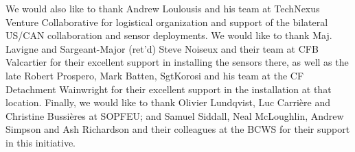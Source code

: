 \documentclass[fire,article,submit,moreauthors]{mdpi}
\providecommand{\DIFadd}[1]{{\protect\color{blue}\uwave{#1}}} %
\providecommand{\DIFaddbegin}{} %
\providecommand{\DIFaddend}{} %
\begin{document}
We would also like to thank Andrew Loulousis and his team at TechNexus
Venture Collaborative for logistical organization and support of the
bilateral US/CAN collaboration and sensor deployments. We would like to
thank Maj. Lavigne and Sargeant-Major (ret'd) Steve Noiseux and their
team at CFB Valcartier for their excellent support in installing the
sensors there, as well as the late Robert Prospero, Mark Batten,
Sgt\DIFaddbegin \DIFadd{.~}\DIFaddend Korosi and his team at the CF Detachment Wainwright for their
excellent support in the installation at that location. Finally, we
would like to thank Olivier Lundqvist, Luc Carrière and Christine
Bussières at SOPFEU; and Samuel Siddall, Neal McLoughlin, Andrew Simpson
and Ash Richardson and their colleagues at the BCWS for their support in
this initiative.

\clearpage


\vspace{6pt}











\end{document}
